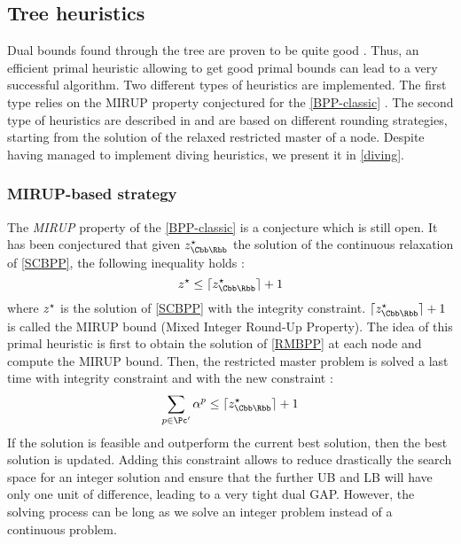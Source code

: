 \subsection{Tree heuristics}
\label{heuristic-tree}

Dual bounds found through the tree are proven to be quite good \cite{sadykov2013bin}. Thus, an efficient primal heuristic allowing to get good primal bounds can lead to a very successful algorithm. Two different types of heuristics are implemented. The first type relies on the MIRUP property conjectured for the \eqref{BPP-classic} \cite{delorme2016bin}. The second type of heuristics are described in \cite{wascher1996heuristics} and are based on different rounding strategies, starting from the solution of the relaxed restricted master of a node. Despite having managed to implement diving heuristics, we present it in \ref{diving}. 

\subsubsection{MIRUP-based strategy}

The \textit{MIRUP} property of the \eqref{BPP-classic} is a conjecture which is still open. It has been conjectured \cite{scheithauer1995modified} that given $\opt{z}_{\Cbb\Rbb}$ the solution of the continuous relaxation of \eqref{SCBPP}, the following inequality holds :
\begin{equation}
	\label{mirup}
	\opt{z} \leq \ceil{\opt{z}_{\Cbb\Rbb}} + 1
\end{equation}
where ${z}^{\star}$ is the solution of \eqref{SCBPP} with the integrity constraint. $\ceil{\opt{z}_{\Cbb\Rbb}} + 1$ is called the MIRUP bound (Mixed Integer Round-Up Property). The idea of this primal heuristic is first to obtain the solution of \eqref{RMBPP} at each node and compute the MIRUP bound. Then, the restricted master problem is solved a last time with integrity constraint and with the new constraint :
\begin{equation*}
	\sum_{p \in \Pc'} \alpha^p \leq \ceil{\opt{z}_{\Cbb\Rbb}} + 1
\end{equation*}
If the solution is feasible and outperform the current best solution, then the best solution is updated. Adding this constraint allows to reduce drastically the search space for an integer solution and ensure that the further UB and LB will have only one unit of difference, leading to a very tight dual GAP. However, the solving process can be long as we solve an integer problem instead of a continuous problem.


